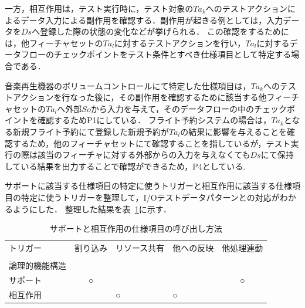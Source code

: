 一方，相互作用は，テスト実行時に，テスト対象の$Ta_k$へのテストアクションによるデータ入力による副作用を確認する．副作用が起きる例としては，入力データを$Ds$へ登録した際の状態の変化などが挙げられる．
この確認をするためには，他フィーチャセットの$Ta_l$に対するテストアクションを行い，$Ta_l$に対するデータフローのチェックポイントをテスト条件とすべき仕様項目として特定する場合である．

音楽再生機器のボリュームコントロールにて特定した仕様項目は，$Ta_k$へのテストアクションを行なった後に，その副作用を確認するために該当する他フィーチャセットの$Ta_l$へ外部$So$から入力を与えて，そのデータフローの中のチェックポイントを確認するためP1にしている．
フライト予約システムの場合は，$Ta_k$となる新規フライト予約にて登録した新規予約が$Ta_l$の結果に影響を与えることを確認するため，他のフィーチャセットにて確認することを指しているが，テスト実行の際は該当のフィーチャに対する外部からの入力を与えなくても$Ds$にて保持している結果を出力することで確認ができるため，P4としている.

サポートに該当する仕様項目の特定に使うトリガーと相互作用に該当する仕様項目の特定に使うトリガーを整理して，I/Oテストデータパターンとの対応がわかるようにした．
整理した結果を表~\ref{tab:D-4SandI2}に示す．
\begin{table}[htbp]
  \centering
  \caption{サポートと相互作用の仕様項目の呼び出し方法}
    \begin{tabular}{|p{5em}|c|p{4em}|p{5em}|c|}
    \hline
    トリガー  & \multicolumn{1}{p{4em}|}{割り込み} & リソース共有 & 他への反映 & \multicolumn{1}{p{5em}|}{他処理連動} \bigstrut[t]\\
    \multicolumn{1}{|l|}{} &       & \multicolumn{1}{r|}{} & \multicolumn{1}{r|}{} &  \\
    論理的機能構造 &       & \multicolumn{1}{r|}{} & \multicolumn{1}{r|}{} &  \bigstrut[b]\\
    \hline
    サポート  & \multicolumn{1}{p{4em}|}{○} & \multicolumn{1}{c|}{} & \multicolumn{1}{c|}{} & \multicolumn{1}{p{4em}|}{○} \bigstrut\\
    \hline
    相互作用  &       & ○     & ○     &  \bigstrut\\
    \hline
    \end{tabular}%
  \label{tab:D-4SandI2}%
\end{table}%

